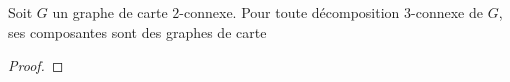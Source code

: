 \documentclass{scrartcl}
\begin{document}
\begin{flushleft}
\begin{prop}\label{3connCompCarte}
    Soit $G$ un graphe de carte $2$-connexe. Pour toute décomposition $3$-connexe de $G$, ses composantes sont des graphes de carte
\end{prop}

\begin{proof}
    
\end{proof}

\begin{comment}

\subsection{Contractibilité des arrêtes}

On aimerait donner une condition nécessaire et suffisante permettant de contracter les arrêtes d'un graphe de carte.
Certaines arrêtes sont clairement contractibles, comme celles représentées par $2$ régions partageant une courbe, d'autres ne le sont
pas, comme l'arrête $xy$ du graphe $G_{pch}$ \ref{Gpch}, qui est un graphe de carte.
On dénotera par $\mathcal{G}_{pch}$ l'ensemble des graphes obtenu depuis $G_{pch}$,
en ajoutant des arrêtes entre les sommets distincts de $a, b, c$

\begin{figure}[h]
    \caption{Le graphe $G_{pch}$}\label{Gpch}
    \begin{center}
        \begin{tikzpicture}[auto]
            \begin{scope}[every node/.style={circle, draw}]
                \node (a) {$a$};
                \node (b) [right = 20mm of a] {$b$};
                \node (c) [right = of b] {$c$};
                \node (x) [below left = 12mm and 5mm of a] {$x$};
                \node (y) [below right = 12mm and 5mm of a] {$y$};
                \node (u) [below = of b] {$u$};
                \node (v) [below = of c] {$v$};

                \node (a1) [right = 20mm of v] {$a$};
                \node (b1) [right = of a1] {$b$};
                \node (c1) [right = of b1] {$c$};
                \node (d1) [right = of c1] {$d$};
                \node (x1) [above = of a1] {$x$};
                \node (y1) [above = of b1] {$y$};
                \node (u1) [above = of c1] {$u$};
                \node (v1) [above = of d1] {$v$};
            \end{scope}


\end{comment}
\end{flushleft}
\end{document}
